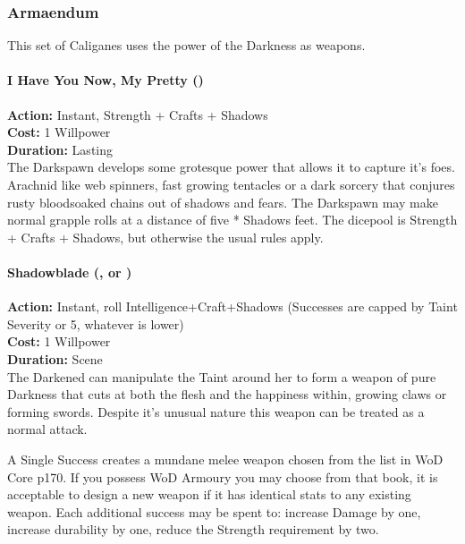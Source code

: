 \subsubsection*{Armaendum}

This set of Caliganes uses the power of the Darkness as weapons. \\

\paragraph*{I Have You Now, My Pretty (\textbullet\textbullet)}

\noindent \textbf{Action:} Instant, Strength + Crafts + Shadows\\

\noindent \textbf{Cost:} 1 Willpower\\

\noindent \textbf{Duration:} Lasting \\

\noindent The Darkspawn develops some grotesque power that allows it to capture it's foes. Arachnid like web spinners, fast growing tentacles or a dark sorcery that conjures rusty bloodsoaked chains out of shadows and fears. The Darkspawn may make normal grapple rolls at a distance of five * Shadows feet. The dicepool is Strength + Crafts + Shadows, but otherwise the usual rules apply.\\

\paragraph*{Shadowblade (\textbullet, \textbullet\textbullet\textbullet or \textbullet\textbullet\textbullet\textbullet\textbullet)}

\noindent \textbf{Action:} Instant, roll Intelligence+Craft+Shadows (Successes are capped by Taint Severity or 5, whatever is lower) \\

\noindent \textbf{Cost:} 1 Willpower \\

\noindent \textbf{Duration:} Scene \\

\noindent The Darkened can manipulate the Taint around her to form a weapon of pure Darkness that cuts at both the flesh and the happiness within, growing claws or forming swords. Despite it's unusual nature this weapon can be treated as a normal attack.

A Single Success creates a mundane melee weapon chosen from the list in WoD Core p170. If you possess WoD Armoury you may choose from that book, it is acceptable to design a new weapon if it has identical stats to any existing weapon. Each additional success may be spent to: increase Damage by one, increase durability by one, reduce the Strength requirement by two.

